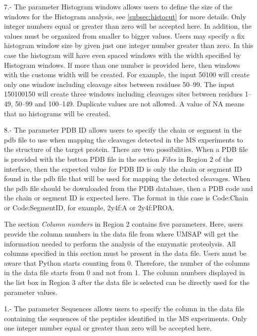 \num{7}.- The parameter Histogram windows\label{par:enzdigHist} allows users to define the size of the windows for the Histogram analysis, see \autoref{subsec:histocut} for more details. Only integer numbers equal or greater than zero will be accepted here. In addition, the values must be organized from smaller to bigger values. Users may specify a fix histogram window size by given just one integer number greater than zero. In this case the histogram will have even spaced windows with the width specified by Histogram windows. If more than one number is provided here, then windows with the customs width will be created. For example, the input \numlist{50 100} will create only one window including cleavage sites between residues \numrange{50}{99}. The input \numlist{1 50 100 150} will create three windows including cleavages sites between residues \numrange{1}{49}, \numrange{50}{99} and \numrange{100}{149}. Duplicate values are not allowed. A value of NA means that no histograms will be created.

\num{8}.- The parameter PDB ID\label{par:pdbID} allows users to specify the chain or segment in the pdb file to use when mapping the cleavages detected in the MS experiments to the structure of the target protein. There are two possibilities. When a PDB file is provided with the button PDB file in the section \textit{Files} in Region \num{2} of the interface, then the expected value for PDB ID is only the chain or segment ID found in the pdb file that will be used for mapping the detected cleavages. When the pdb file should be downloaded from the PDB database, then a PDB code and the chain or segment ID is expected here. The format in this case is Code:Chain or Code:SegmentID, for example, 2y4f:A or 2y4f:PROA. 

The section \textit{Column numbers} in Region \num{2} contains five parameters. Here, users provide the column numbers in the data file from where UMSAP will get the information needed to perform the analysis of the enzymatic proteolysis. All columns specified  in this section must be present in the data file. Users must be aware that Python starts counting from \num{0}. Therefore, the number of the columns in the data file starts from \num{0} and not from \num{1}. The column numbers displayed in the list box in Region \num{3} after the data file is selected can be directly used for the parameter values.  

\num{1}.- The parameter Sequences allows users to specify the column in the data file containing the sequences of the peptides identified in the MS experiments. Only one integer number equal or greater than zero will be accepted here.

